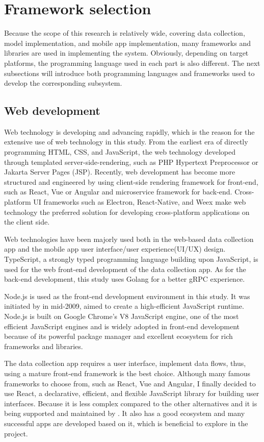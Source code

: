 \section{Framework selection}
\label{sec:Framework selection}
Because the scope of this research is relatively wide, covering data collection, model implementation, and mobile app implementation, many frameworks and libraries are used in implementing the system.
Obviously, depending on target platforms, the programming language used in each part is also different.
The next subsections will introduce both programming languages and frameworks used to develop the corresponding subsystem.

\subsection{Web development} %
Web technology is developing and advancing rapidly, which is the reason for the extensive use of web technology in this study.
From the earliest era of directly programming HTML, CSS, and JavaScript, the web technology developed through templated server-side-rendering, such as PHP Hypertext Preprocessor or Jakarta Server Pages (JSP).
Recently, web development has become more structured and engineered by using client-side rendering framework for front-end, such as React, Vue or Angular and microservice framework for back-end.
Cross-platform UI frameworks such as Electron, React-Native, and Weex make web technology the preferred solution for developing cross-platform applications on the client side.

Web technologies have been majorly used both in the web-based data collection app and the mobile app user interface/user experience(UI/UX) design.
TypeScript, a strongly typed programming language building upon JavaScript, is used for the web front-end development of the data collection app.
As for the back-end development, this study uses Golang for a better gRPC experience.

Node.js is used as the front-end development environment in this study.
It was initiated by \citet{nodejs2021} in mid-2009, aimed to create a high-efficient JavaScript runtime.
Node.js is built on Google Chrome's V8 JavaScript engine, one of the most efficient JavaScript engines and is widely adopted in front-end development because of its powerful package manager and excellent ecosystem for rich frameworks and libraries.

The data collection app requires a user interface, implement data flows, thus, using a mature front-end framework is the best choice.
Although many famous frameworks to choose from, such as React, Vue and Angular, I finally decided to use React, a declarative, efficient, and flexible JavaScript library for building user interfaces.
Because it is less complex compared to the other alternatives and it is being supported and maintained by \citet{react2021}.
It also has a good ecosystem and many successful apps are developed based on it, which is beneficial to explore in the project.

